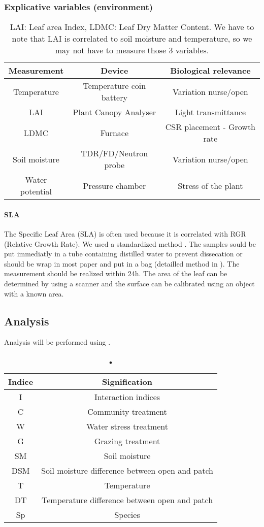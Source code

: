 \documentclass[12pt, a4paper]{article} %
\begin{document}
\subsubsection{Explicative variables (environment)}
\begin{table}[h]
\begin{center}
\begin{tabular}{ccc}
Measurement & Device & Biological relevance\\
\hline
Temperature & Temperature coin battery & Variation nurse/open\\
LAI & Plant Canopy Analyser & Light transmittance\\
LDMC & Furnace & CSR placement - Growth rate\\
Soil moisture & TDR/FD/Neutron probe & Variation nurse/open\\
Water potential & Pressure chamber & Stress of the plant\\
\hline 
\end{tabular}
\caption{LAI: Leaf area Index, LDMC: Leaf Dry Matter Content. We have to note that LAI is correlated to soil moisture and temperature, so we may not have to measure those 3 variables.}
\end{center}
\end{table}

\paragraph{SLA}
The Specific Leaf Area (SLA) is often used because it is correlated with RGR (Relative Growth Rate). We used a standardized method \citet{perez-harguindeguy_new_2013}. The samples sould be put immediatly in a tube containing distilled water to prevent dissecation or should be wrap in most paper and put in a bag (detailled method in \citep{perez-harguindeguy_new_2013}). The measurement should be realized within 24h. The area of the leaf can be determined by using a scanner and the surface can be calibrated using an object with a known area.
\subsection{Analysis}
Analysis will be performed using \citep{RCoreTeam2015}.
\begin{table}[h]
\begin{center}
\begin{tabular}{cc}
Indice & Signification\\
\hline
I   & Interaction indices\\
C   & Community treatment\\
W   & Water stress treatment\\
G   & Grazing treatment\\
SM  & Soil moisture\\
DSM & Soil moisture difference between open and patch\\
T   & Temperature \\
DT  & Temperature difference between open and patch \\
Sp  & Species \\
\hline 
\end{tabular}
\caption{•}
\end{center}
\end{table}
\end{document}
